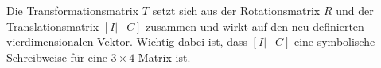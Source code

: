 Die Transformationsmatrix $T$ setzt sich aus der Rotationsmatrix $R$ und der Translationsmatrix  $[I |-C]$ zusammen und wirkt auf den neu definierten vierdimensionalen Vektor. Wichtig dabei ist, dass $[I| -C]$ eine symbolische Schreibweise für eine $3 \times 4$ Matrix ist.   




